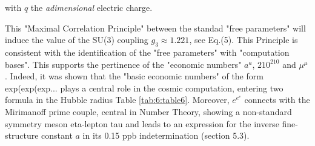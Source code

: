 \documentclass[a4paper,9pt]{article}
\begin{document}
with $q$ the \textit{adimensional} electric charge. 

This "Maximal Correlation Principle" between the standad "free parameters" will induce the value of the SU(3) coupling $g_3 \approx 1.221$, see Eq.(5). This Principle is consistent with the identification of the "free parameters" with "computation bases". This supports the pertinence of the "economic numbers" $a^a$, $210^{210}$ and $\mu^{\mu}$. Indeed, it was shown that the "basic economic numbers" of the form exp(exp(exp... plays a central role in the cosmic computation, entering two formula in the Hubble radius Table \ref{tab:6:table6}. Moreover, $e^{e^e}$ connects with the Mirimanoff prime couple, central in Number Theory, showing a non-standard symmetry meson eta-lepton tau and leads to an expression for the inverse fine-structure constant $a$ in its 0.15 ppb indetermination (section 5.3).

\end{document}
